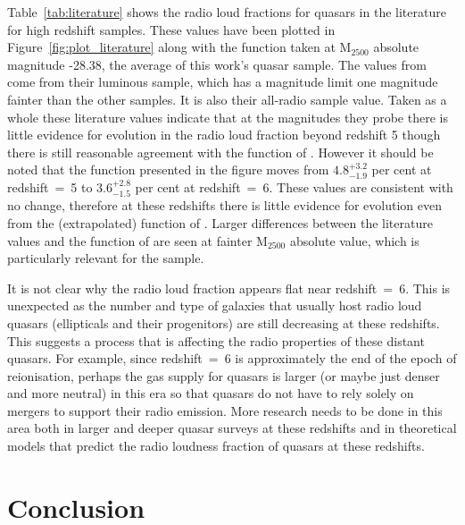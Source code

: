 \documentclass[a4paper,fleqn,usenatbib]{mnras}
\begin{document}
 
{Table~\ref{tab:literature} shows the radio loud fractions for quasars in the literature for high redshift samples.  These values have been plotted in Figure~\ref{fig:plot_literature} along with the \citet{jiang07} function taken at M$_{2500}$ absolute magnitude -28.38, the average of this work's quasar sample.  The values from \citet{liu21} come from their luminous sample, which  has a magnitude limit one magnitude fainter than the other samples.  It is also their all-radio sample value.  Taken as a whole these literature values indicate that at the magnitudes they probe there is little evidence for evolution in the radio loud fraction beyond redshift 5 though there is still reasonable agreement with the function of \citet{jiang07}.  However it should be noted that the \citet{jiang07} function presented in the figure moves from $4.8^{+3.2}_{-1.9}$ per cent at redshift~=~5 to $3.6^{+2.8}_{-1.5}$ per cent at redshift~=~6.  These values are consistent with no change, therefore at these redshifts there is little evidence for evolution even from the (extrapolated) function of \citet{jiang07}. Larger differences between the literature values and the function of \citet{jiang07} are seen at fainter M$_{2500}$ absolute value, which is particularly relevant for the \citet{liu21} sample.}

{It is not clear why the radio loud fraction appears flat near redshift~=~6.  This is unexpected as the number and type of {galaxies}
 that usually host radio loud quasars (ellipticals and their progenitors) are still decreasing at these redshifts.  This suggests a process that is affecting the radio properties of these distant quasars.  For example, since redshift~=~6 is approximately the end of the epoch of reionisation,  perhaps the gas supply for quasars is larger (or maybe just denser and more neutral) in this era so that quasars do not have to rely solely on mergers to support their radio emission.  More research needs to be done in this area both in larger and deeper quasar surveys at these redshifts and in theoretical models that predict the radio loudness fraction of quasars at these redshifts.}    


\section{Conclusion}
\label{Conclusion}
\end{document}
